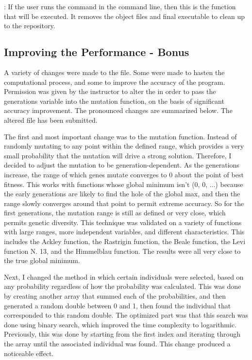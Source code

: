 \documentclass[12pt]{article}
\begin{document}
: If the user runs the command  in the command line, then this is the function that will be executed. It removes the object files and final executable to clean up to the repository.
	
	\subsection{Improving the Performance - Bonus}
	
A variety of changes were made to the  file. Some were made to hasten the computational process, and some to improve the accuracy of the program. Permission was given by the instructor to alter the  in order to pass  the generations variable into the mutation function, on the basis of significant accuracy improvement. The pronounced changes are summarized below. The altered  file has been submitted.

The first and most important change was to the mutation function. Instead of randomly mutating to any point within the defined range, which provides a very small probability that the mutation will drive a strong solution. Therefore, I decided to adjust the mutation to be generation-dependent. As the generations increase, the range of which genes mutate converges to 0 about the point of best fitness. This works with functions whose global minimum isn't (0, 0, ...) because the early generations are likely to find the hole of the global max, and then the range slowly converges around that point to permit extreme accuracy. So for the first generations, the mutation range is still as defined or very close, which permits genetic diversity. This technique was validated on a variety of functions with large ranges, more independent variables, and different characteristics. This includes the Ackley function, the Rastrigin function, the Beale function, the Levi function N. 13, and the Himmelblau function. The results were all very close to the true global minimum.

Next, I changed the method in which certain individuals were selected, based on any probability regardless of how the probability was calculated. This was done by creating another array that summed each of the probabilities, and then generated a random double between 0 and 1, then found the individual that corresponded to this random double. The optimized part was that this search was done using binary search, which improved the time complexity to logarithmic. Previously, this was done by starting from the first index and iterating through the array until the associated individual was found. This change produced a noticeable effect.
\end{document}
